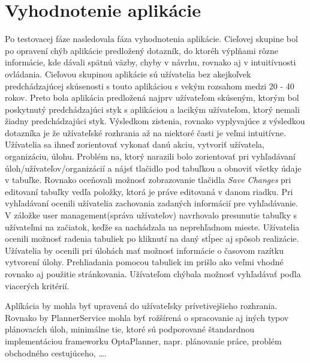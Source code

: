 \section{Vyhodnotenie aplikácie}
Po testovacej fáze nasledovala fáza vyhodnotenia aplikácie. Cieľovej skupine bol po opravení chýb aplikácie predložený dotazník, do ktoréh výplňami rôzne informácie, kde dávali spätnú väzby, chyby v návrhu, rovnako aj v intuitívnosti ovládania. Cieľovou skupinou aplikácie sú užívatelia bez akejkoľvek predchádzajúcej skúsenosti s touto aplikáciou s vekým rozsahom medzi 20 - 40 rokov. Preto bola aplikácia predložená najprv užívateľom skúseným, ktorým bol poskytnutý predchádzajúci styk s aplikáciou a lacikým užívateľom, ktorý nemali žiadny predchádzajúci styk. Výsledkom zistenia, rovnako vyplyvajúce z výsledkou dotazníka je že užívateľské rozhrania až na niektoré časti je veľmi intuitívne. Užívatelia sa ihneď zorientovať vykonať danú akciu, vytvoriť užívatela, organizáciu, úlohu. Problém na, ktorý narazili bolo zorientovať pri vyhľadávaní úloh/užívateľov/organizácií a nájsť tlačidlo pod tabuľkou  a obnoviť všetky údaje v tabuľke. Rovnako oceňovali možnosť zobrazovanie tlačidla \emph{Save Changes} pri editovaní tabuľky vedľa položky, ktorá je práve editovaná v danom riadku. Pri vyhľadávaní ocenili užívatelia zachovania zadaných informácií pre vyhľadávanie. V záložke user management(správa užívateľov) navrhovalo presunutie tabuľky s užívateľmi na začiatok, keďže sa nachádzala na neprehľadnom mieste. Užívatelia ocenili možnosť radenia tabuliek po kliknutí na daný stĺpec aj spôsob realizácie. Užívatelia by ocenili pri úlohách mať možnosť informácie o časovom razítku vytvorení úlohy. Prehliadania pomocou tabuliek im prišlo ako veľmi vhodné rovnako aj použitie stránkovania. Užívateľom chýbala možnosť vyhľadávať poďla viacerých kritérií.

Aplíkácia by mohla byť upravená do užívateľsky prívetivejšieho rozhrania. Rovnako by PlannerService mohla byť rožšírená o spracovanie aj iných typov plánovacích úloh, minimálne tie, ktoré sú podporované štandardnou implementáciou frameworku OptaPlanner, napr. plánovanie práce, problém obchodného cestujúceho, \ldots.


